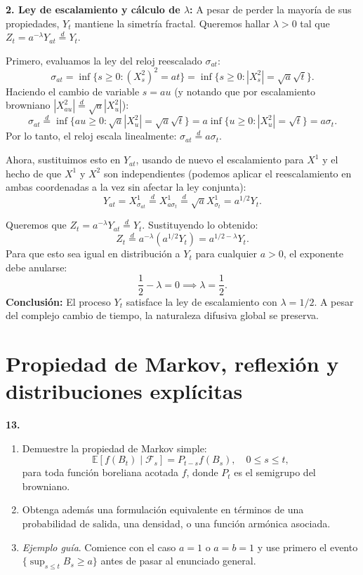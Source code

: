 \documentclass[11pt, letterpaper]{article}
\begin{document}
\begin{solucion}
    \textbf{2. Ley de escalamiento y cálculo de $\lambda$:}
    A pesar de perder la mayoría de sus propiedades, $Y_t$ mantiene la simetría fractal.
    Queremos hallar $\lambda > 0$ tal que $Z_t = a^{-\lambda} Y_{at} \stackrel{d}{=} Y_t$.
    
    Primero, evaluamos la ley del reloj reescalado $\sigma_{at}$:
    \[ \sigma_{at} = \inf\{s \ge 0 : (X_s^2)^2 = at\} = \inf\{s \ge 0 : |X_s^2| = \sqrt{a}\sqrt{t}\}. \]
    Haciendo el cambio de variable $s = au$ (y notando que por escalamiento browniano $|X_{au}^2| \stackrel{d}{=} \sqrt{a}|X_u^2|$):
    \[ \sigma_{at} \stackrel{d}{=} \inf\{au \ge 0 : \sqrt{a}|X_u^2| = \sqrt{a}\sqrt{t}\} = a \inf\{u \ge 0 : |X_u^2| = \sqrt{t}\} = a \sigma_t. \]
    Por lo tanto, el reloj escala linealmente: $\sigma_{at} \stackrel{d}{=} a \sigma_t$.
    
    Ahora, sustituimos esto en $Y_{at}$, usando de nuevo el escalamiento para $X^1$ y el hecho de que $X^1$ y $X^2$ son independientes (podemos aplicar el reescalamiento en ambas coordenadas a la vez sin afectar la ley conjunta):
    \[ Y_{at} = X_{\sigma_{at}}^1 \stackrel{d}{=} X_{a\sigma_t}^1 \stackrel{d}{=} \sqrt{a} X_{\sigma_t}^1 = a^{1/2} Y_t. \]
    
    Queremos que $Z_t = a^{-\lambda} Y_{at} \stackrel{d}{=} Y_t$. Sustituyendo lo obtenido:
    \[ Z_t \stackrel{d}{=} a^{-\lambda} \left( a^{1/2} Y_t \right) = a^{1/2 - \lambda} Y_t. \]
    Para que esto sea igual en distribución a $Y_t$ para cualquier $a > 0$, el exponente debe anularse:
    \[ \frac{1}{2} - \lambda = 0 \implies \lambda = \frac{1}{2}. \]
    \textbf{Conclusión:} El proceso $Y_t$ satisface la ley de escalamiento con $\lambda = 1/2$. A pesar del complejo cambio de tiempo, la naturaleza difusiva global se preserva.
\end{solucion}

\newpage
\section{Propiedad de Markov, reflexión y distribuciones explícitas}

\begin{ejercicio}
    \textbf{13.} 
    \begin{enumerate}
        \item Demuestre la propiedad de Markov simple:
        \[ \mathbb{E}[f(B_t) \mid \mathcal{F}_s] = P_{t-s}f(B_s), \quad 0 \le s \le t, \]
        para toda función boreliana acotada $f$, donde $P_t$ es el semigrupo del browniano.
        \item Obtenga además una formulación equivalente en términos de una probabilidad de salida, una densidad, o una función armónica asociada.
        \item \textit{Ejemplo guía}. Comience con el caso $a = 1$ o $a = b = 1$ y use primero el evento $\{\sup_{s \le t} B_s \ge a\}$ antes de pasar al enunciado general.
    \end{enumerate}
\end{ejercicio}
\end{document}
